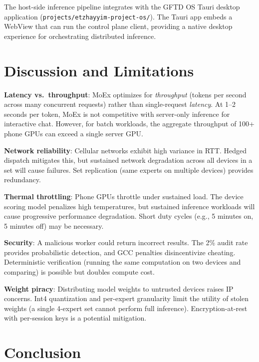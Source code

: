 \documentclass[11pt,a4paper]{article}
\begin{document}
The host-side inference pipeline integrates with the GFTD OS Tauri
desktop application (\texttt{projects/etzhayyim-project-os/}). The
Tauri app embeds a WebView that can run the control plane client,
providing a native desktop experience for orchestrating distributed
inference.

\section{Discussion and Limitations}
\label{sec:discussion}

\textbf{Latency vs.\ throughput}: MoEx optimizes for \emph{throughput}
(tokens per second across many concurrent requests) rather than
single-request \emph{latency}. At 1--2 seconds per token, MoEx is
not competitive with server-only inference for interactive chat.
However, for batch workloads, the aggregate throughput of 100+ phone
GPUs can exceed a single server GPU.

\textbf{Network reliability}: Cellular networks exhibit high variance
in RTT. Hedged dispatch mitigates this, but sustained network
degradation across all devices in a set will cause failures. Set
replication (same experts on multiple devices) provides redundancy.

\textbf{Thermal throttling}: Phone GPUs throttle under sustained load.
The device scoring model penalizes high temperatures, but sustained
inference workloads will cause progressive performance degradation.
Short duty cycles (e.g., 5 minutes on, 5 minutes off) may be
necessary.

\textbf{Security}: A malicious worker could return incorrect results.
The 2\% audit rate provides probabilistic detection, and GCC penalties
disincentivize cheating. Deterministic verification (running the same
computation on two devices and comparing) is possible but doubles
compute cost.

\textbf{Weight piracy}: Distributing model weights to untrusted devices
raises IP concerns. Int4 quantization and per-expert granularity
limit the utility of stolen weights (a single 4-expert set cannot
perform full inference). Encryption-at-rest with per-session keys
is a potential mitigation.

\section{Conclusion}
\label{sec:conclusion}
\end{document}
